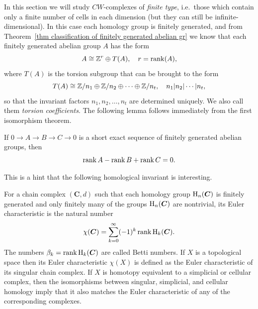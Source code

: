 In this section we will study $CW$-complexes of \emph{finite type}, i.e.~those which contain only a finite number of cells in each dimension (but they can still be infinite-dimensional). In this case each homology group is finitely generated, and from Theorem~\ref{thm classification of finitely generated abelian gr} we know that each finitely generated abelian group $A$ has the form
\[A\cong \mathbb{Z}^r\oplus T(A),\quad r=\operatorname{rank}(A),\]
where $T(A)$ is the torsion subgroup that can be brought to the form
\[T(A)\cong \mathbb{Z}/n_1\oplus \mathbb{Z}/n_2\oplus \cdots \oplus \mathbb{Z}/n_t,\quad n_1|n_2|\cdots |n_t,\]
so that the invariant factors $n_1,n_2,\ldots,n_t$ are determined uniquely. We also call them \emph{torsion coefficients}. The following lemma follows immediately from the first isomorphism theorem.

\begin{lem}
    If $0\to A\to B\to C\to 0$ is a short exact sequence of finitely generated abelian groups, then
    \[\operatorname{rank} A-\operatorname{rank} B+\operatorname{rank} C=0.\]
\end{lem}

This is a hint that the following homological invariant is interesting.

\begin{defn}
    For a chain complex $(\bm{C},d)$ such that each homology group $\mathrm{H}_n(\boldsymbol{C})$ is finitely generated and only finitely many of the groups $\mathrm{H}_n(\boldsymbol{C})$ are nontrivial, its Euler characteristic is the natural number
    \[\chi(\boldsymbol{C})=\sum_{k=0}^\infty (-1)^k \operatorname{rank} \mathrm{H}_k(\boldsymbol{C}).\]
    The numbers $\beta_k=\operatorname{rank} \mathrm{H}_k(\boldsymbol{C})$ are called Betti numbers.
    If $X$ is a topological space then its Euler characteristic $\chi(X)$ is defined as the Euler characteristic of its singular chain complex. If $X$ is homotopy equivalent to a simplicial or cellular complex, then the isomorphisms between singular, simplicial, and cellular homology imply that it also matches the Euler characteristic of any of the corresponding complexes.
\end{defn}

